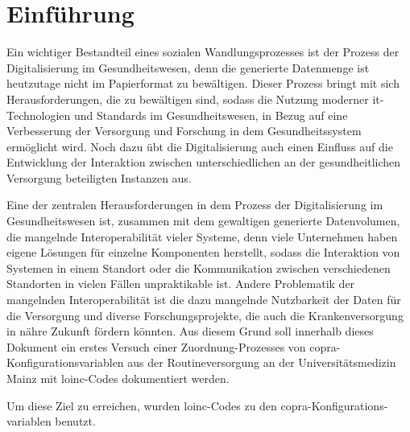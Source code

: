 \chapter{Einführung}

Ein wichtiger Bestandteil eines sozialen Wandlungsprozesses ist der Prozess der Digitalisierung im Gesundheitswesen, denn die generierte Datenmenge ist heutzutage nicht im Papierformat zu bewältigen. Dieser Prozess bringt mit sich Herausforderungen, die zu bewältigen sind, sodass die Nutzung moderner \ac{it}-Technologien und Standards im Gesundheitswesen, in Bezug auf eine Verbesserung der Versorgung und Forschung in dem Gesundheitssystem ermöglicht wird. Noch dazu übt die Digitalisierung auch einen Einfluss auf die Entwicklung der Interaktion zwischen unterschiedlichen an der gesundheitlichen Versorgung beteiligten Instanzen aus. 

Eine der zentralen Herausforderungen in dem Prozess der Digitalisierung im Gesundheitswesen ist, zusammen mit dem gewaltigen generierte Datenvolumen, die mangelnde Interoperabilität vieler Systeme, denn viele Unternehmen haben eigene Lösungen für einzelne Komponenten herstellt, sodass die Interaktion von Systemen in einem Standort oder die Kommunikation zwischen verschiedenen Standorten in vielen Fällen unpraktikable ist. Andere Problematik der mangelnden Interoperabilität ist die dazu mangelnde Nutzbarkeit der Daten für die Versorgung und diverse Forschungsprojekte, die auch die Krankenversorgung in nähre Zukunft fördern könnten. Aus diesem Grund soll innerhalb dieses Dokument ein erstes Versuch einer Zuordnung-Prozesses von \ac{copra}-Konfigurationsvariablen aus der Routineversorgung an der Universitätsmedizin Mainz mit \ac{loinc}-Codes dokumentiert werden. 

Um diese Ziel zu erreichen, wurden \ac{loinc}-Codes zu den \ac{copra}-Konfigurations- variablen benutzt. %



